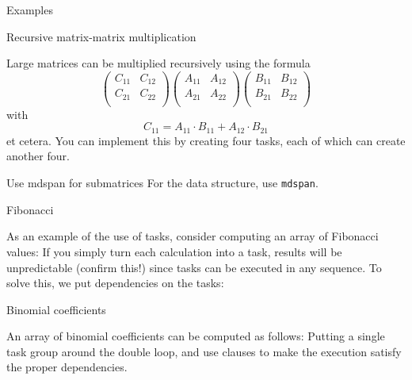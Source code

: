  {Examples}

 {Recursive matrix-matrix multiplication}

Large matrices can be multiplied recursively using the formula
\[ 
\begin{pmatrix}
  C_{11}&C_{12}\\ C_{21}&C_{22}\\
\end{pmatrix}
\begin{pmatrix}
  A_{11}&A_{12}\\ A_{21}&A_{22}\\
\end{pmatrix}
\begin{pmatrix}
  B_{11}&B_{12}\\ B_{21}&B_{22}\\
\end{pmatrix}
\]
with
\[ C_{11} = A_{11}\cdot B_{11} + A_{12}\cdot B_{21} \]
et cetera.
You can implement this by creating four tasks, each of which can create another four.

\begin{cppnote}{Use mdspan for submatrices}
  For the data structure, use \lstinline{mdspan}.
\end{cppnote}

 {Fibonacci}

As an example of the use of tasks, consider computing an array of Fibonacci values:
%
%
If you simply turn each calculation into a task, results will be
unpredictable (confirm this!) since tasks can be executed in any sequence.
To solve this, we put dependencies on the tasks:
%

 {Binomial coefficients}

\begin{exercise}
  An array of binomial coefficients can be computed as follows:
  Putting a single task group around the double loop, and use
   clauses to make the execution satisfy the proper dependencies.
\end{exercise}

